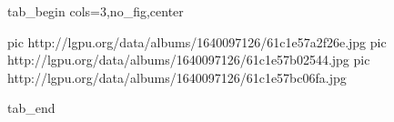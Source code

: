  
 
 
 
 


\ifcmt
  tab_begin cols=3,no_fig,center

     pic http://lgpu.org/data/albums/1640097126/61c1e57a2f26e.jpg
		 pic http://lgpu.org/data/albums/1640097126/61c1e57b02544.jpg
		 pic http://lgpu.org/data/albums/1640097126/61c1e57bc06fa.jpg

  tab_end
\fi
